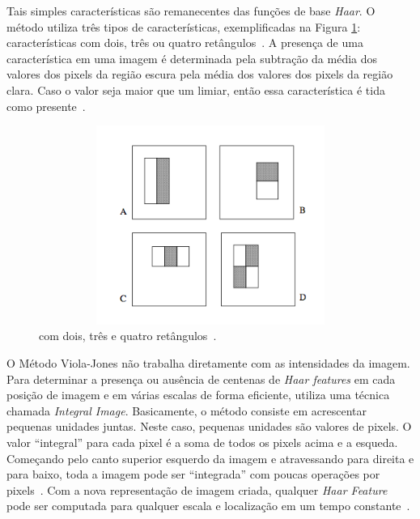 Tais simples características são remanecentes das funções de base \textit{Haar}. O método utiliza três tipos de características, exemplificadas na Figura \ref{haarfeaturestypes}: características com dois, três ou quatro retângulos~\cite{violajones}. A presença de uma característica em uma imagem é determinada pela subtração da média dos valores dos pixels da região escura pela média dos valores dos pixels da região clara. Caso o valor seja maior que um limiar, então essa característica é tida como presente~\cite{servodetection}.

	\begin{figure}[hbt]
		\begin{center}
			\includegraphics[height=6.5cm,width=12.5cm]{figuras/2.FundamentacaoTeorica/haarfeaturestypes.png}
		\end{center}
		\caption{ com dois, três e quatro retângulos~\cite{violajones}.}
		\label{haarfeaturestypes}
	\end{figure}

O Método Viola-Jones não trabalha diretamente com as intensidades da imagem. Para determinar a presença ou ausência de centenas de \textit{Haar features} em cada posição de imagem e em várias escalas de forma eficiente, utiliza uma técnica chamada \textit{Integral Image}. Basicamente, o método consiste em acrescentar pequenas unidades juntas. Neste caso, pequenas unidades são valores de pixels. O valor ``integral'' para cada pixel é a soma de todos os pixels acima e a esqueda. Começando pelo canto superior esquerdo da imagem e atravessando para direita e para baixo, toda a imagem pode ser ``integrada'' com poucas operações por pixels~\cite{servodetection, violajones}. Com a nova representação de imagem criada, qualquer \textit{Haar Feature} pode ser computada para qualquer escala e localização em um tempo constante~\cite{violajones}.

